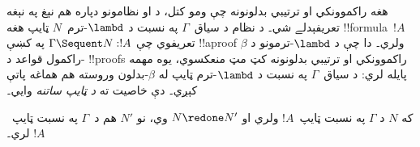 \documentclass[../../../include/open-logic-section]{subfiles}
\begin{document}


هغه راکموونکي او ترتيبي بدلونونه چې ومو کتل، د
 او  نظامونو دپاره هم نېغ په نېغه
تعريفېدلے شي۔ د  نظام د سياق~$\Gamma$ په
نسبت د $\lambd$-ترم~$N$ ټايپ هغه !!{formula}~$!A$
تعريفوي چې $\Gamma \Sequent N : !A$ په 
کښې !!a{proof} ولري۔ دا چې د $\lambd$-ترمونو د
$\beta$-راکمول قواعد د !!{proof}s راکموونکي او ترتيبي
بدلونونه کټ مټ منعکسوي، يوه مهمه پايله لري: د سياق~$\Gamma$
په نسبت د $\lambd$-ترم ټايپ له $\beta$-بدلون وروسته
هم هماغه پاتې کېږي۔ دې خاصيت ته \emph{د ټايپ ساتنه} وايي۔

\begin{prop}
که $N$ د $\Gamma$ په نسبت ټايپ~$!A$ ولري او
$N \redone N'$ وي، نو $N'$ هم د~$\Gamma$ په نسبت
ټايپ~$!A$ لري۔
\end{prop}
\end{document}
